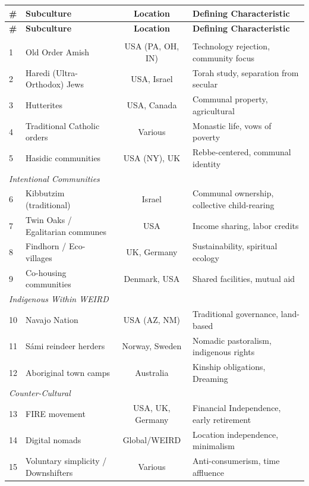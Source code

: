 \begin{center}
\scriptsize
\begin{longtable}{@{}llcp{4cm}@{}}
\toprule
\textbf{\#} & \textbf{Subculture} & \textbf{Location} & \textbf{Defining Characteristic} \\
\midrule
\endfirsthead
\toprule
\textbf{\#} & \textbf{Subculture} & \textbf{Location} & \textbf{Defining Characteristic} \\
\midrule
\endhead
\bottomrule
\endlastfoot
\multicolumn{4}{l}{\textit{Religious Communities}} \\
1 & Old Order Amish & USA (PA, OH, IN) & Technology rejection, community focus \\
2 & Haredi (Ultra-Orthodox) Jews & USA, Israel & Torah study, separation from secular \\
3 & Hutterites & USA, Canada & Communal property, agricultural \\
4 & Traditional Catholic orders & Various & Monastic life, vows of poverty \\
5 & Hasidic communities & USA (NY), UK & Rebbe-centered, communal identity \\
\midrule
\multicolumn{4}{l}{\textit{Intentional Communities}} \\
6 & Kibbutzim (traditional) & Israel & Communal ownership, collective child-rearing \\
7 & Twin Oaks / Egalitarian communes & USA & Income sharing, labor credits \\
8 & Findhorn / Eco-villages & UK, Germany & Sustainability, spiritual ecology \\
9 & Co-housing communities & Denmark, USA & Shared facilities, mutual aid \\
\midrule
\multicolumn{4}{l}{\textit{Indigenous Within WEIRD}} \\
10 & Navajo Nation & USA (AZ, NM) & Traditional governance, land-based \\
11 & Sámi reindeer herders & Norway, Sweden & Nomadic pastoralism, indigenous rights \\
12 & Aboriginal town camps & Australia & Kinship obligations, Dreaming \\
\midrule
\multicolumn{4}{l}{\textit{Counter-Cultural}} \\
13 & FIRE movement & USA, UK, Germany & Financial Independence, early retirement \\
14 & Digital nomads & Global/WEIRD & Location independence, minimalism \\
15 & Voluntary simplicity / Downshifters & Various & Anti-consumerism, time affluence \\
\end{longtable}
\end{center}

